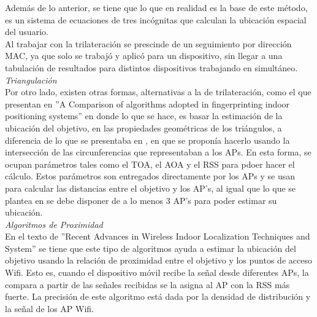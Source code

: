 Además de lo anterior, se tiene que lo que en realidad es la base de este método, es un sistema de ecuaciones de tres incógnitas que calculan la ubicación espacial del usuario.\\

Al trabajar con la trilateración se prescinde de un seguimiento por dirección MAC, ya que solo se trabajó y aplicó para un dispositivo, sin llegar a una tabulación de resultados para distintos dispositivos trabajando en simultáneo.\\

\textit{Triangulación}\\

Por otro lado, existen otras formas, alternativas a la de trilateración, como el que presentan en ''A Comparison of algorithms adopted in fingerprinting indoor positioning systems'' en donde lo que se hace, es basar la estimación de la ubicación del objetivo, en las propiedades geométricas de los triángulos, a diferencia de lo que se presentaba en \cite{1}, en que se proponía hacerlo usando la intersección de las circunferencias que representaban a los \acp{AP}. En esta forma, se ocupan parámetros tales como el \ac{TOA}, el \ac{AOA} y  el \ac{RSS} para pdoer hacer el cálculo. Estos parámetros son entregados directamente por los \acp{AP} y se usan para calcular las distancias entre el objetivo y los AP's, al igual que lo que se plantea en  \cite{1} se debe disponer de a lo menos 3 AP's para poder estimar su ubicación.\\

\textit{Algoritmos de Proximidad}\\

En el texto de ''Recent Advances in Wireless Indoor Localization Techniques
and System'' se tiene que este tipo de algoritmos ayuda a estimar la ubicación del objetivo usando la relación de proximidad entre el objetivo y los puntos de acceso Wifi. Esto es, cuando el dispositivo móvil recibe la señal desde diferentes \acp{AP}, la compara a partir de las señales recibidas  se la asigna al AP con la RSS más fuerte. La precisión de este algoritmo está dada por la densidad de distribución y la señal de los AP Wifi.\\





